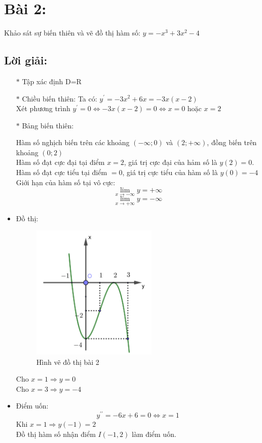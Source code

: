 \section*{Bài 2:}
Khảo sát sự biến thiên và vẽ đồ thị hàm số: $y = -x^3 + 3x^2 - 4$

\subsection*{Lời giải:}
\begin{itemize}
\item[$\ast$] Tập xác định D=R
\item[$\ast$] Chiều biến thiên:
Ta có: $y^{\prime} = -3x^2 + 6x = -3x(x-2)$ \\
Xét phương trình $y^{\prime} = 0 \Leftrightarrow -3x(x-2) = 0 \Leftrightarrow x = 0$ hoặc $x = 2$
\item[$\ast$] Bảng biến thiên:
	\begin{figure}[H]
		\centering
	\end{figure}
	Hàm số nghịch biến trên các khoảng $(-\infty; 0)$ và $(2; +\infty)$, đồng biến trên khoảng $(0; 2)$ \\
	Hàm số đạt cực đại tại điểm $x=2$, giá trị cực đại của hảm số là $y(2)=0$. \\
	Hàm số đạt cực tiểu tại điểm $=0$, giá trị cực tiểu của hàm số là $y(0)=-4$ \\
	Giới hạn của hàm số tại vô cực: 
	$$\lim_{x \to -\infty}{y} = +\infty$$
	$$\lim_{x \to +\infty}{y} = -\infty$$
\item Đồ thị:
	\begin{figure}[H]
		\centering
		\includegraphics[width=6cm]{images/quizz2/quizz_2_figure.png}
		\caption{Hình vẽ đồ thị bài 2}
	\end{figure}
	Cho $x = 1 \Rightarrow y = 0$ \\
	Cho $x = 3 \Rightarrow y = -4$
\item Điểm uốn:
	$$y^{\prime\prime} = -6x + 6 = 0 \Leftrightarrow x = 1$$
	Khi $x = 1 \Rightarrow y(-1) = 2$ \\
	Đồ thị hàm số nhận điểm $I(-1, 2)$ làm điểm uốn. 
\end{itemize}

